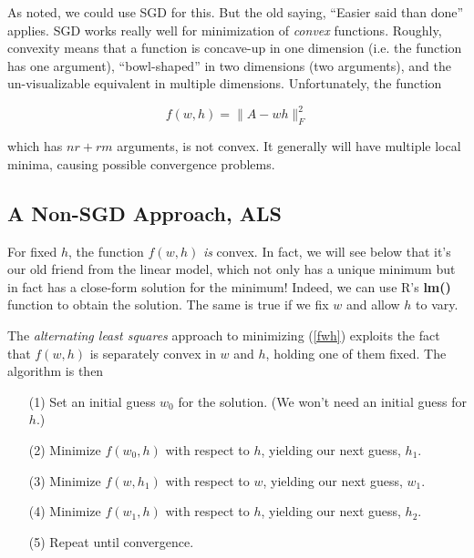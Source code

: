 As noted, we could use SGD for this.  But the old saying, ``Easier said
than done'' applies.  SGD works really well for minimization of
\textit{convex} functions.  Roughly, convexity means that a function
is concave-up in one dimension (i.e. the function has one argument),
``bowl-shaped'' in two dimensions (two arguments), and the
un-visualizable equivalent in multiple dimensions.  Unfortunately, 
the function

\begin{equation}
\label{fwh}
f(w,h) = \|A - wh\|_F^2
\end{equation}

which has $nr + rm$ arguments, is not convex.  It generally will have
multiple local minima, causing possible convergence problems.

\subsection{A Non-SGD Approach, ALS}

For fixed $h$, the function $f(w,h)$ \textit{is} convex.  In fact, we
will see below that it's our old friend from the linear model, which not
only has a unique minimum but in fact has a close-form solution for the
minimum!  Indeed, we can use R's \textbf{lm()} function to obtain the
solution.  The same is true if we fix $w$ and allow $h$ to vary.

The \textit{alternating least squares} approach to minimizing (\ref{fwh})
exploits the fact that $f(w,h)$ is separately convex in $w$ and $h$,
holding one of them fixed.  The algorithm is then

\begin{itemize}

\item [(1)] Set an initial guess $w_0$ for the solution.  (We won't need
an initial guess for $h$.)

\item [(2)] Minimize $f(w_0,h)$ with respect to $h$, yielding our next
guess, $h_1$.

\item [(3)] Minimize $f(w,h_1)$ with respect to $w$, yielding our next
guess, $w_1$.

\item [(4)] Minimize $f(w_1,h)$ with respect to $h$, yielding our next
guess, $h_2$.

\item [(5)] Repeat until convergence.

\end{itemize} 

